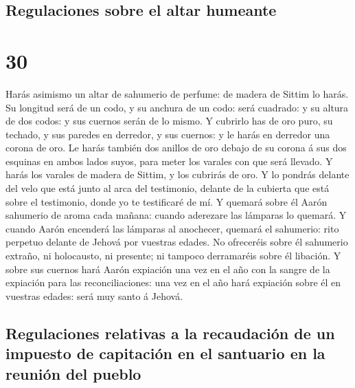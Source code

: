 \hypertarget{regulaciones-sobre-el-altar-humeante}{%
\subsection{Regulaciones sobre el altar
humeante}\label{regulaciones-sobre-el-altar-humeante}}

\hypertarget{section-29}{%
\section{30}\label{section-29}}

 Harás asimismo un altar de sahumerio de perfume: de
madera de Sittim lo harás.  Su longitud será de un codo, y
su anchura de un codo: será cuadrado: y su altura de dos codos: y sus
cuernos serán de lo mismo.  Y cubrirlo has de oro puro, su
techado, y sus paredes en derredor, y sus cuernos: y le harás en
derredor una corona de oro.  Le harás también dos anillos
de oro debajo de su corona á sus dos esquinas en ambos lados suyos, para
meter los varales con que será llevado.  Y harás los
varales de madera de Sittim, y los cubrirás de oro.  Y lo
pondrás delante del velo que está junto al arca del testimonio, delante
de la cubierta que está sobre el testimonio, donde yo te testificaré de
mí.  Y quemará sobre él Aarón sahumerio de aroma cada
mañana: cuando aderezare las lámparas lo quemará.  Y
cuando Aarón encenderá las lámparas al anochecer, quemará el sahumerio:
rito perpetuo delante de Jehová por vuestras edades.  No
ofreceréis sobre él sahumerio extraño, ni holocausto, ni presente; ni
tampoco derramaréis sobre él libación.  Y sobre sus
cuernos hará Aarón expiación una vez en el año con la sangre de la
expiación para las reconciliaciones: una vez en el año hará expiación
sobre él en vuestras edades: será muy santo á Jehová.

\hypertarget{regulaciones-relativas-a-la-recaudaciuxf3n-de-un-impuesto-de-capitaciuxf3n-en-el-santuario-en-la-reuniuxf3n-del-pueblo}{%
\subsection{Regulaciones relativas a la recaudación de un impuesto de
capitación en el santuario en la reunión del
pueblo}\label{regulaciones-relativas-a-la-recaudaciuxf3n-de-un-impuesto-de-capitaciuxf3n-en-el-santuario-en-la-reuniuxf3n-del-pueblo}}

